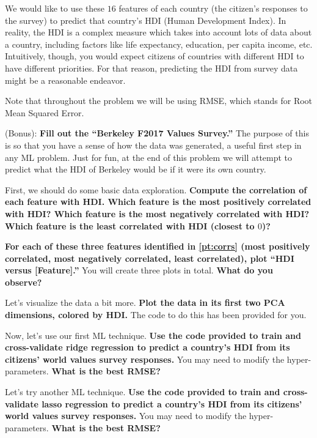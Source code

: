 We would like to use these $16$ features of each country (the citizen's responses to the survey) to predict that country's HDI (Human Development Index). In reality, the HDI is a complex measure which takes into account lots of data about a country, including factors like life expectancy, education, per capita income, etc. Intuitively, though, you would expect citizens of countries with different HDI to have different priorities. For that reason, predicting the HDI from survey data might be a reasonable endeavor.

Note that throughout the problem we will be using RMSE, which stands for Root Mean Squared Error.

\begin{Parts}


\Part (Bonus): \textbf{Fill out the ``Berkeley F2017 Values Survey.''} The purpose of this is so that you have a sense of how the data was generated, a useful first step in any ML problem. Just for fun, at the end of this problem we will attempt to predict what the HDI of Berkeley would be if it were its own country.


\Part \label{pt:corrs} First, we should do some basic data exploration. \textbf{Compute the correlation of each feature with HDI. Which feature is the most positively correlated with HDI? Which feature is the most negatively correlated with HDI? Which feature is the least correlated with HDI (closest to $0$)?}




\Part \textbf{For each of these three features identified in \ref{pt:corrs} (most positively correlated, most negatively correlated, least correlated), plot ``HDI versus [Feature].''} You will create three plots in total. \textbf{What do you observe?}




\Part Let's visualize the data a bit more. \textbf{Plot the data in its first two PCA dimensions, colored by HDI.} The code to do this has been provided for you.




\Part Now, let's use our first ML technique. \textbf{Use the code provided to train and cross-validate ridge regression to predict a country's HDI from its citizens' world values survey responses.} You may need to modify the hyper-parameters. \textbf{What is the best RMSE?}




\Part Let's try another ML technique. \textbf{Use the code provided to train and cross-validate lasso regression to predict a country's HDI from its citizens' world values survey responses.} You may need to modify the hyper-parameters. \textbf{What is the best RMSE?}





\end{Parts}
